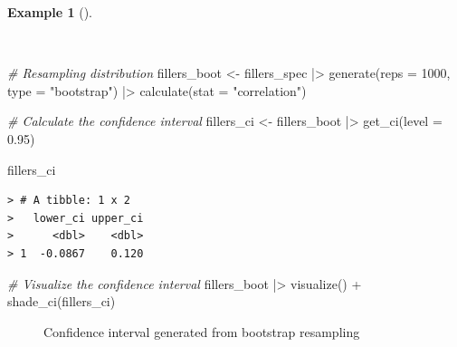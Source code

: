 \documentclass[
  letterpaper,
  DIV=11,
  numbers=noendperiod]{scrreprt}
\newenvironment{Shaded}{\begin{snugshade}}{\end{snugshade}}
\newcommand{\AttributeTok}[1]{\textcolor[rgb]{0.00,0.00,0.00}{#1}}
\newcommand{\CommentTok}[1]{\textcolor[rgb]{0.00,0.00,0.00}{\textit{#1}}}
\newcommand{\DecValTok}[1]{\textcolor[rgb]{0.00,0.00,0.00}{#1}}
\newcommand{\FloatTok}[1]{\textcolor[rgb]{0.00,0.00,0.00}{#1}}
\newcommand{\FunctionTok}[1]{\textcolor[rgb]{0.00,0.00,0.00}{#1}}
\newcommand{\NormalTok}[1]{\textcolor[rgb]{0.00,0.00,0.00}{#1}}
\newcommand{\OtherTok}[1]{\textcolor[rgb]{0.00,0.00,0.00}{#1}}
\newcommand{\SpecialCharTok}[1]{\textcolor[rgb]{0.00,0.00,0.00}{#1}}
\newcommand{\StringTok}[1]{\textcolor[rgb]{0.00,0.00,0.00}{#1}}
\theoremstyle{definition}
\newtheorem{example}{Example}[chapter]
\theoremstyle{remark}
\begin{document}
\begin{example}[]\protect\hypertarget{exm-ida-num-bi-age-ci}{}\label{exm-ida-num-bi-age-ci}

~

\begin{Shaded}
\begin{Highlighting}[]
\CommentTok{\# Resampling distribution}
\NormalTok{fillers\_boot }\OtherTok{\textless{}{-}}
\NormalTok{  fillers\_spec }\SpecialCharTok{|\textgreater{}}
  \FunctionTok{generate}\NormalTok{(}\AttributeTok{reps =} \DecValTok{1000}\NormalTok{, }\AttributeTok{type =} \StringTok{"bootstrap"}\NormalTok{) }\SpecialCharTok{|\textgreater{}}
  \FunctionTok{calculate}\NormalTok{(}\AttributeTok{stat =} \StringTok{"correlation"}\NormalTok{)}

\CommentTok{\# Calculate the confidence interval}
\NormalTok{fillers\_ci }\OtherTok{\textless{}{-}}
\NormalTok{  fillers\_boot }\SpecialCharTok{|\textgreater{}}
  \FunctionTok{get\_ci}\NormalTok{(}\AttributeTok{level =} \FloatTok{0.95}\NormalTok{)}

\NormalTok{fillers\_ci}
\end{Highlighting}
\end{Shaded}

\begin{verbatim}
> # A tibble: 1 x 2
>   lower_ci upper_ci
>      <dbl>    <dbl>
> 1  -0.0867    0.120
\end{verbatim}

\begin{Shaded}
\begin{Highlighting}[]
\CommentTok{\# Visualize the confidence interval}
\NormalTok{fillers\_boot }\SpecialCharTok{|\textgreater{}}
  \FunctionTok{visualize}\NormalTok{() }\SpecialCharTok{+}
  \FunctionTok{shade\_ci}\NormalTok{(fillers\_ci)}
\end{Highlighting}
\end{Shaded}

\begin{figure}[H]


\caption{\label{fig-ida-num-bi-age-ci}Confidence interval generated from
bootstrap resampling}

\end{figure}%

\end{example}
\end{document}
